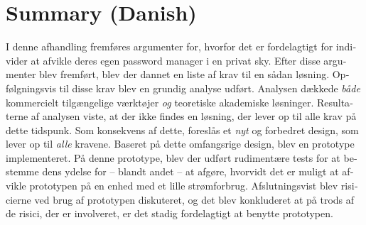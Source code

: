\chapter{Summary (Danish)}
	\begin{otherlanguage}{danish}
		I denne afhandling fremføres argumenter for, hvorfor det er fordelagtigt for individer at afvikle deres egen password manager i en privat sky. Efter disse argumenter blev fremført, blev der dannet en liste af krav til en sådan løsning. Opfølgningsvis til disse krav blev en grundig analyse udført. Analysen dækkede \emph{både} kommercielt tilgængelige værktøjer \emph{og} teoretiske akademiske løsninger. Resultaterne af analysen viste, at der ikke findes en løsning, der lever op til alle krav på dette tidspunk. Som konsekvens af dette, foreslås et \emph{nyt} og forbedret design, som lever op til \emph{alle} kravene. Baseret på dette omfangsrige design, blev en prototype implementeret. På denne prototype, blev der udført rudimentære tests for at bestemme dens ydelse for -- blandt andet -- at afgøre, hvorvidt det er muligt at afvikle prototypen på en enhed med et lille strømforbrug. Afslutningsvist blev risicierne ved brug af prototypen diskuteret, og det blev konkluderet at på trods af de risici, der er involveret, er det stadig fordelagtigt at benytte prototypen.
	\end{otherlanguage}
